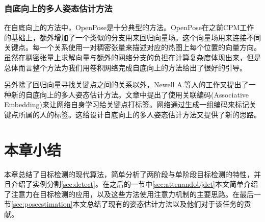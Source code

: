 \subsubsection{自底向上的多人姿态估计方法}
\label{subsubsec:bottomuppose}
在自底向上的方法中，OpenPose\cite{Cao2016Realtime}是十分典型的方法。OpenPose在之前CPM工作的基础上，额外增加了一个类似的分支用来回归向量场。这个向量场用来连接不同关键点。每一个关系使用一对稠密张量来描述对应的热图上每个位置的向量方向。虽然在稠密张量上求解向量与额外的网络分支的负担在计算复杂度体现出来，但是总体而言整个方法为我们用卷积网络完成自底向上的方法给出了很好的引导。

另外除了回归向量寻找关键点之间的关系以外，Newell A.\cite{Newell2017Associative}等人的工作又提出了一种新的自底向上的多人姿态估计方法。文章中提出了使用关联编码(Associative Embedding)来让网络自身学习给关键点打标签。网络通过生成一组编码来标记关键点所属的人的标签。这给设计自底向上的多人姿态估计方法又提供了新的思路。


\section{本章小结}
本章总结了目标检测的现代算法，简单分析了两阶段与单阶段目标检测的特性，并且介绍了实例分割\ref{sec:detect}。在之后的一节中\ref{sec:attenandobjdet}本文简单介绍了注意力在目标检测的应用，以及这些方法使用注意力机制的主要思路。在最后一节\ref{sec:poseestimation}本文总结了现有的姿态估计方法以及他们对于该任务的贡献。

